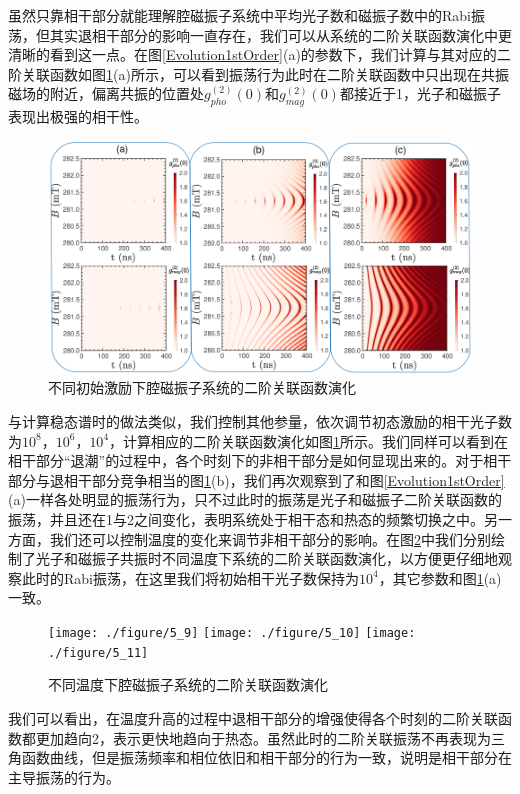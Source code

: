 虽然只靠相干部分就能理解腔磁振子系统中平均光子数和磁振子数中的Rabi振荡，但其实退相干部分的影响一直存在，我们可以从系统的二阶关联函数演化中更清晰的看到这一点。在图\ref{Evolution1stOrder}(a)的参数下，我们计算与其对应的二阶关联函数如图\ref{Evolution2edOrder}(a)所示，可以看到振荡行为此时在二阶关联函数中只出现在共振磁场的附近，偏离共振的位置处$g_{pho}^{(2)}(0)$和$g_{mag}^{(2)}(0)$都接近于1，光子和磁振子表现出极强的相干性。
\begin{figure}[htbp]
	\centering
	\includegraphics[width=3\basefigurewidth,clip]{./figure/5_3}
	\caption{不同初始激励下腔磁振子系统的二阶关联函数演化} 
	\label{Evolution2edOrder}
\end{figure}
与计算稳态谱时的做法类似，我们控制其他参量，依次调节初态激励的相干光子数为$10^8$，$10^6$，$10^4$，计算相应的二阶关联函数演化如图\ref{Evolution2edOrder}所示。我们同样可以看到在相干部分“退潮”的过程中，各个时刻下的非相干部分是如何显现出来的。对于相干部分与退相干部分竞争相当的图\ref{Evolution2edOrder}(b)，我们再次观察到了和图\ref{Evolution1stOrder}(a)一样各处明显的振荡行为，只不过此时的振荡是光子和磁振子二阶关联函数的振荡，并且还在1与2之间变化，表明系统处于相干态和热态的频繁切换之中。另一方面，我们还可以控制温度的变化来调节非相干部分的影响。在图\ref{Evolution2edOrderTVary}中我们分别绘制了光子和磁振子共振时不同温度下系统的二阶关联函数演化，以方便更仔细地观察此时的Rabi振荡，在这里我们将初始相干光子数保持为$10^4$，其它参数和图\ref{Evolution2edOrder}(a)一致。
\begin{figure}[htbp]
	\centering
	\texttt{[image: ./figure/5\_9]}
	\texttt{[image: ./figure/5\_10]}
	\texttt{[image: ./figure/5\_11]}
	\caption{不同温度下腔磁振子系统的二阶关联函数演化} 
	\label{Evolution2edOrderTVary}
\end{figure}
我们可以看出，在温度升高的过程中退相干部分的增强使得各个时刻的二阶关联函数都更加趋向2，表示更快地趋向于热态。虽然此时的二阶关联振荡不再表现为三角函数曲线，但是振荡频率和相位依旧和相干部分的行为一致，说明是相干部分在主导振荡的行为。

